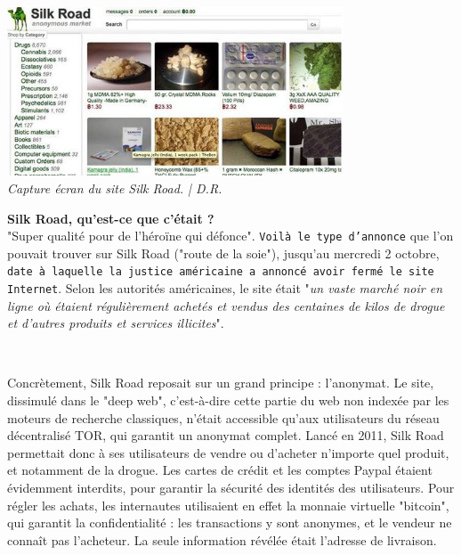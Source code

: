 \documentclass[11pt,twoside,a4paper]{article}
\begin{document}
\begin{minipage}[ht]{10.25cm}
	\includegraphics[width=10.00cm]{img/3489421_3_e9f5_capture-ecran-du-site-silk-road_a5297453ba95c8e1e96a3d54fce55dd5.jpg} ~\\
	\emph{Capture {\'e}cran du site Silk Road. | D.R.}~\\
\end{minipage} \hfill \begin{minipage}[ht]{9.00cm}
	\textbf{Silk Road, qu'est-ce que c'{\'e}tait ?}~\\

	"Super qualit{\'e} pour de l'h{\'e}ro{\"i}ne qui d{\'e}fonce". \texttt{Voil{\`a} le type d'annonce\footnotemark} que l'on pouvait trouver sur Silk Road ("route de la soie"), jusqu'au mercredi 2 octobre, \texttt{date {\`a} laquelle la justice am{\'e}ricaine a annonc{\'e} avoir ferm{\'e} le site Internet\footnotemark }. Selon les autorit{\'e}s am{\'e}ricaines, le site {\'e}tait "\emph{un vaste march{\'e} noir en ligne o{\`u} {\'e}taient r{\'e}guli{\`e}rement achet{\'e}s et vendus des centaines de kilos de drogue et d'autres produits et services illicites}". ~\\
\end{minipage}~\\

Concr{\`e}tement, Silk Road reposait sur un grand principe : l'anonymat. Le site, dissimul{\'e} dans le "deep web", c'est-{\`a}-dire cette partie du web non index{\'e}e par les moteurs de recherche classiques, n'{\'e}tait accessible qu'aux utilisateurs du r{\'e}seau d{\'e}centralis{\'e} TOR, qui garantit un anonymat complet. Lanc{\'e} en 2011, Silk Road permettait donc {\`a} ses utilisateurs de vendre ou d'acheter n'importe quel produit, et notamment de la drogue. Les cartes de cr{\'e}dit et les comptes Paypal {\'e}taient {\'e}videmment interdits, pour garantir la s{\'e}curit{\'e} des identit{\'e}s des utilisateurs. Pour r{\'e}gler les achats, les internautes utilisaient en effet la monnaie virtuelle "bitcoin", qui garantit la confidentialit{\'e} : les transactions y sont anonymes, et le vendeur ne conna{\^i}t pas l'acheteur. La seule information r{\'e}v{\'e}l{\'e}e {\'e}tait l'adresse de livraison. ~\\
\end{document}
